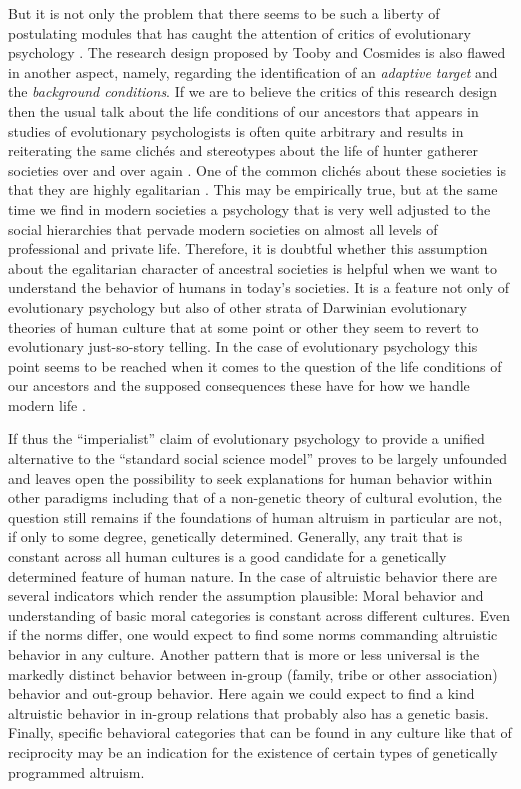 But it is not only the problem that there seems to be such a liberty of
postulating modules that has caught the attention of critics of evolutionary
psychology \cite[p.\ 40ff.]{dupre:2001}. The research design proposed by Tooby
and Cosmides is also flawed in another aspect, namely, regarding the
identification of an {\em adaptive target} and the {\em background conditions}. If
we are to believe the critics of this research design then the usual talk
about the life conditions of our ancestors that appears in studies of
evolutionary psychologists is often quite arbitrary and results in reiterating
the same clich\'es and stereotypes about the life of hunter gatherer societies
over and over again \cite[p.\ 23ff.]{dupre:2001}. One of the common clich\'es
about these societies is that they are highly egalitarian
\cite[p.\ 372ff.]{boyd-richerson-henrich:2003}. This may be empirically true,
but at the same time we find in modern societies a psychology that is very well
adjusted to the social hierarchies that pervade modern societies on
almost all levels of professional and private life. Therefore, it is doubtful
whether this assumption about the egalitarian character of ancestral societies
is helpful when we want to understand the behavior of humans in today's
societies. It is a feature not only of evolutionary psychology but also of
other strata of Darwinian evolutionary theories of human culture that at some
point or other they seem to revert to evolutionary just-so-story telling. In
the case of evolutionary psychology this point seems to be reached when it
comes to the question of the life conditions of our ancestors and the supposed
consequences these have for how we handle modern life \cite[p.\ 
21ff.]{dupre:2001}.

If thus the ``imperialist'' claim of evolutionary psychology to provide a
unified alternative to the ``standard social science model'' proves to be
largely unfounded and leaves open the possibility to seek explanations for
human behavior within other paradigms including that of a non-genetic theory
of cultural evolution, the question still remains if the foundations of human
altruism in particular are not, if only to some degree, genetically determined.
Generally, any trait that is constant across all human cultures is a good
candidate for a genetically determined feature of human nature. In the case of
altruistic behavior there are several indicators which render the assumption
plausible: Moral behavior and understanding of basic moral categories is
constant across different cultures. Even if the norms differ, one would expect
to find some norms commanding altruistic behavior in any culture. Another
pattern that is more or less universal is the markedly distinct behavior
between in-group (family, tribe or other association) behavior and out-group
behavior. Here again we could expect to find a kind altruistic behavior in
in-group relations that probably also has a genetic basis. Finally, specific
behavioral categories that can be found in any culture like that of
reciprocity may be an indication for the existence of certain types of
genetically programmed altruism.

